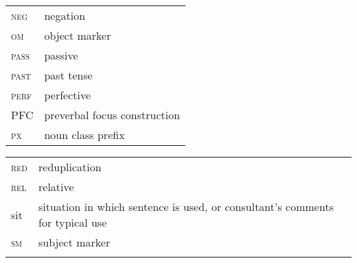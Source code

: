 \documentclass[output=paper]{langsci/langscibook}
\begin{document}
\begin{tabularx}{.45\textwidth}{lX}
\textsc{neg} & negation \\
\textsc{om} & object marker \\
\textsc{pass} & passive \\
\textsc{past} & past tense \\
\textsc{perf} & perfective \\
PFC & preverbal focus construction \\
\textsc{px} & noun class prefix \\
\end{tabularx} 
\begin{tabularx}{.45\textwidth}{lX}
\textsc{red} & reduplication \\
\textsc{rel} & relative \\
sit & situation in which sentence is used, or consultant’s comments for typical use \\
\textsc{sm} & subject marker \\
\\
\end{tabularx}
  

\printbibliography[heading=subbibliography,notkeyword=this]
\end{document}
